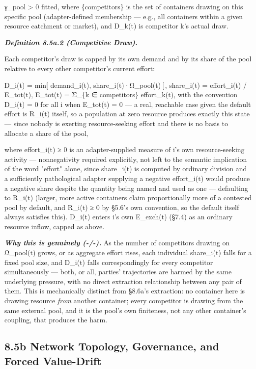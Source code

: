 \documentclass[
]{article}
\begin{document}
γ\_pool \textgreater{} 0 fitted, where \{competitors\} is the set of
containers drawing on this specific pool (adapter-defined membership ---
e.g., all containers within a given resource catchment or market), and
D\_k(t) is competitor k's actual draw.

\emph{\textbf{Definition 8.5a.2 (Competitive Draw).}}

Each competitor's draw is capped by its own demand and by its share of
the pool relative to every other competitor's current effort:

D\_i(t) = min{[} demand\_i(t), share\_i(t)·Ω\_pool(t) {]}, share\_i(t) =
effort\_i(t) / E\_tot(t), E\_tot(t) = Σ\_\{k ∈ competitors\}
effort\_k(t), with the convention D\_i(t) = 0 for all i when E\_tot(t) =
0 --- a real, reachable case given the default effort is R\_i(t) itself,
so a population at zero resource produces exactly this state --- since
nobody is exerting resource-seeking effort and there is no basis to
allocate a share of the pool,

where effort\_i(t) ≥ 0 is an adapter-supplied measure of i's own
resource-seeking activity --- nonnegativity required explicitly, not
left to the semantic implication of the word "effort" alone, since
share\_i(t) is computed by ordinary division and a sufficiently
pathological adapter supplying a negative effort\_i(t) would produce a
negative share despite the quantity being named and used as one ---
defaulting to R\_i(t) (larger, more active containers claim
proportionally more of a contested pool by default, and R\_i(t) ≥ 0 by
§5.6's own convention, so the default itself always satisfies this).
D\_i(t) enters i's own E\_exch(t) (§7.4) as an ordinary resource inflow,
capped as above.

\emph{\textbf{Why this is genuinely (-/-).}} As the number of
competitors drawing on Ω\_pool(t) grows, or as aggregate effort rises,
each individual share\_i(t) falls for a fixed pool size, and D\_i(t)
falls correspondingly for every competitor simultaneously --- both, or
all, parties' trajectories are harmed by the same underlying pressure,
with no direct extraction relationship between any pair of them. This is
mechanically distinct from §8.6a's extraction: no container here is
drawing resource \emph{from} another container; every competitor is
drawing from the same external pool, and it is the pool's own
finiteness, not any other container's coupling, that produces the harm.

\hypertarget{b-network-topology-governance-and-forced-value-drift}{%
\subsection{8.5b Network Topology, Governance, and Forced
Value-Drift}\label{b-network-topology-governance-and-forced-value-drift}}
\end{document}
